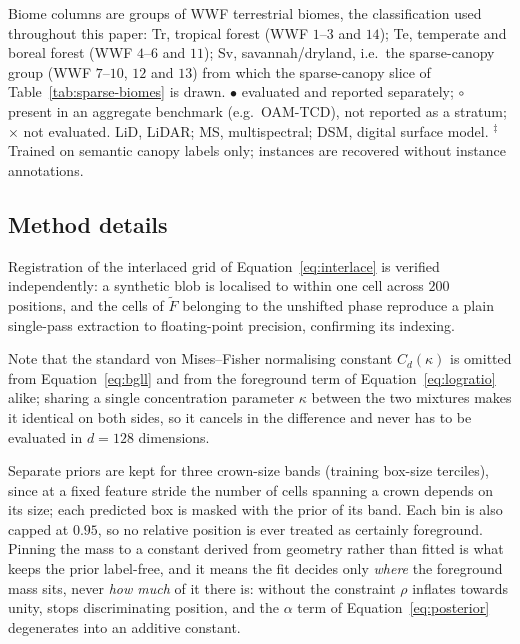 \documentclass[remotesensing,article,submit,moreauthors]{Definitions/mdpi}
\begin{document}
\begin{table}[H]
\vspace{3pt}
\begin{minipage}{0.95\textwidth}
\footnotesize
Biome columns are groups of WWF terrestrial biomes, the classification used throughout this paper: Tr, tropical forest (WWF $1$--$3$ and $14$); Te, temperate and boreal forest (WWF $4$--$6$ and $11$); Sv, savannah/dryland, i.e.\ the sparse-canopy group (WWF $7$--$10$, $12$ and $13$) from which the sparse-canopy slice of Table~\ref{tab:sparse-biomes} is drawn. $\bullet$ evaluated and reported separately; $\circ$ present in an aggregate benchmark (e.g.\ OAM-TCD), not reported as a stratum; $\times$ not evaluated. LiD, LiDAR; MS, multispectral; DSM, digital surface model. $^{\ddagger}$Trained on semantic canopy labels only; instances are recovered without instance annotations.
\end{minipage}
\end{table}

\subsection{Method details}
\label{app:method}

Registration of the interlaced grid of Equation~\eqref{eq:interlace} is verified independently: a synthetic blob is localised to within one cell across $200$ positions, and the cells of $\widetilde F$ belonging to the unshifted phase reproduce a plain single-pass extraction to floating-point precision, confirming its indexing.

Note that the standard von Mises--Fisher normalising constant $C_d(\kappa)$ is omitted from Equation~\eqref{eq:bgll} and from the foreground term of Equation~\eqref{eq:logratio} alike; sharing a single concentration parameter $\kappa$ between the two mixtures makes it identical on both sides, so it cancels in the difference and never has to be evaluated in $d = 128$ dimensions.

Separate priors are kept for three crown-size bands (training box-size terciles), since at a fixed feature stride the number of cells spanning a crown depends on its size; each predicted box is masked with the prior of its band. Each bin is also capped at $0.95$, so no relative position is ever treated as certainly foreground.
Pinning the mass to a constant derived from geometry rather than fitted is what keeps the prior label-free, and it means the fit decides only \emph{where} the foreground mass sits, never \emph{how much} of it there is: without the constraint $\rho$ inflates towards unity, stops discriminating position, and the $\alpha$ term of Equation~\eqref{eq:posterior} degenerates into an additive constant.
\end{document}
